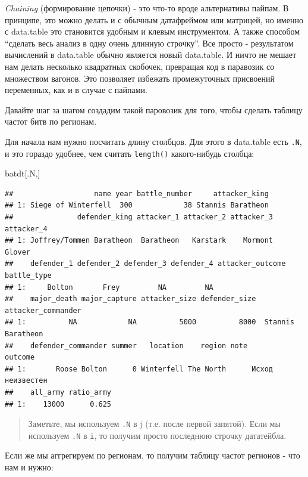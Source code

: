\documentclass[]{book}
\newenvironment{Shaded}{\begin{snugshade}}{\end{snugshade}}
\newcommand{\NormalTok}[1]{#1}
\begin{document}
\emph{Chaining} (формирование цепочки) - это что-то вроде альтернативы
пайпам. В принципе, это можно делать и с обычным датафреймом или
матрицей, но именно с data.table это становится удобным и клевым
инструментом. А также способом ``сделать весь анализ в одну очень
длинную строчку''. Все просто - результатом вычислений в data.table
обычно является новый data.table. И ничто не мешает нам делать несколько
квадратных скобочек, превращая код в паравозик со множеством вагонов.
Это позволяет избежать промежуточных присвоений переменных, как и в
случае с пайпами.

Давайте шаг за шагом создадим такой паровозик для того, чтобы сделать
таблицу частот битв по регионам.

Для начала нам нужно посчитать длину столбцов. Для этого в data.table
есть \texttt{.N}, и это гораздо удобнее, чем считать \texttt{length()}
какого-нибудь столбца:

\begin{Shaded}
\begin{Highlighting}[]
\NormalTok{batdt[.N,]}
\end{Highlighting}
\end{Shaded}

\begin{verbatim}
##                   name year battle_number     attacker_king
## 1: Siege of Winterfell  300            38 Stannis Baratheon
##               defender_king attacker_1 attacker_2 attacker_3 attacker_4
## 1: Joffrey/Tommen Baratheon  Baratheon   Karstark    Mormont     Glover
##    defender_1 defender_2 defender_3 defender_4 attacker_outcome battle_type
## 1:     Bolton       Frey         NA         NA                             
##    major_death major_capture attacker_size defender_size attacker_commander
## 1:          NA            NA          5000          8000  Stannis Baratheon
##    defender_commander summer   location    region note          outcome
## 1:       Roose Bolton      0 Winterfell The North      Исход неизвестен
##    all_army ratio_army
## 1:    13000      0.625
\end{verbatim}

\begin{quote}
Заметьте, мы используем \texttt{.N} в j (т.е. после первой запятой).
Если мы используем \texttt{.N} в \texttt{i}, то получим просто последнюю
строчку дататейбла.
\end{quote}

Если же мы аггрегируем по регионам, то получим таблицу частот регионов -
что нам и нужно:
\end{document}
